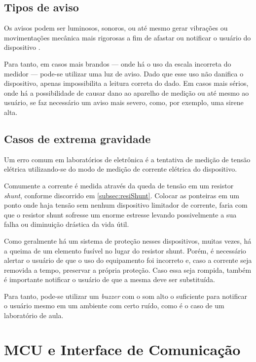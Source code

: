 \subsection{Tipos de aviso} \label{subsec:tiposdeaviso}

Os avisos podem ser luminosos, sonoros, ou até mesmo gerar vibrações ou movimentações mecânica mais rigorosas a fim de afastar ou notificar o usuário do dispositivo \cite{base_alarms}.

Para tanto, em casos mais brandos --- onde há o uso da escala incorreta do medidor --- pode-se utilizar uma luz de aviso. Dado que esse uso não danifica o dispositivo, apenas impossibilita a leitura correta do dado.
Em casos mais sérios, onde há a possibilidade de causar dano ao aparelho de medição ou até mesmo ao usuário, se faz necessário um aviso mais severo, como, por exemplo, uma sirene alta.

\subsection{Casos de extrema gravidade} \label{subsec:casosextrgraves}

Um erro comum em laboratórios de eletrônica é a tentativa de medição de tensão elétrica utilizando-se do modo de medição de corrente elétrica do dispositivo.

Comumente a corrente é medida através da queda de tensão em um resistor \textit{shunt}, conforme discorrido em \ref{subsec:resiShunt}. Colocar as ponteiras em um ponto onde haja tensão sem nenhum dispositivo limitador de corrente, faria com que o resistor shunt sofresse um enorme estresse levando possivelmente a sua falha ou diminuição drástica da vida útil.

Como geralmente há um sistema de proteção nesses dispositivos, muitas vezes, há a queima de um elemento fusível no lugar do resistor shunt. Porém, é necessário alertar o usuário de que o uso do equipamento foi incorreto e, caso a corrente seja removida a tempo, preservar a própria proteção. Caso essa seja rompida, também é importante notificar o usuário de que a mesma deve ser substituída.

Para tanto, pode-se utilizar um \textit{buzzer} com o som alto o suficiente para notificar o usuário mesmo em um ambiente com certo ruído, como é o caso de um laboratório de aula.

\section{MCU e Interface de Comunicação}\label{sec:MCUInterface}

